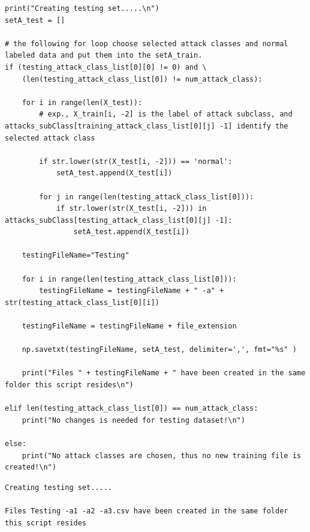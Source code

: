 \begin{verbatim}
print("Creating testing set.....\n")    
setA_test = []

# the following for loop choose selected attack classes and normal labeled data and put them into the setA_train.
if (testing_attack_class_list[0][0] != 0) and \
    (len(testing_attack_class_list[0]) != num_attack_class):

    for i in range(len(X_test)):
        # exp., X_train[i, -2] is the label of attack subclass, and attacks_subClass[training_attack_class_list[0][j] -1] identify the selected attack class

        if str.lower(str(X_test[i, -2])) == 'normal':
            setA_test.append(X_test[i])

        for j in range(len(testing_attack_class_list[0])):
            if str.lower(str(X_test[i, -2])) in attacks_subClass[testing_attack_class_list[0][j] -1]:
                setA_test.append(X_test[i])

    testingFileName="Testing"

    for i in range(len(testing_attack_class_list[0])):
        testingFileName = testingFileName + " -a" + str(testing_attack_class_list[0][i])

    testingFileName = testingFileName + file_extension

    np.savetxt(testingFileName, setA_test, delimiter=',', fmt="%s" )

    print("Files " + testingFileName + " have been created in the same folder this script resides\n")

elif len(testing_attack_class_list[0]) == num_attack_class:
    print("No changes is needed for testing dataset!\n")

else:
    print("No attack classes are chosen, thus no new training file is created!\n")
\end{verbatim}

\begin{verbatim}
Creating testing set.....

Files Testing -a1 -a2 -a3.csv have been created in the same folder this script resides
\end{verbatim}